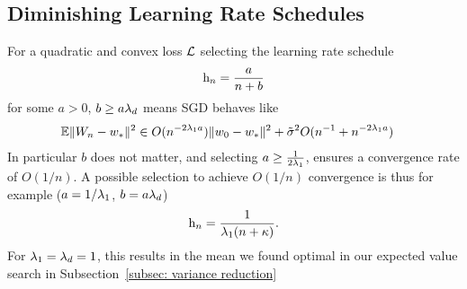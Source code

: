\subsection{Diminishing Learning Rate Schedules}

\begin{theorem}\label{thm: convergence rates for diminishing lr schedules}
	For a quadratic and convex loss \(\mathcal{L}\) selecting the learning rate
	schedule
	\begin{align*}
		\text{h}_n = \frac{a}{n+b}	
	\end{align*}
	for some \(a>0\), \(b\ge a\lambda_d\) means SGD behaves like
	\begin{align*}
		\mathbb{E}\|W_n - w_*\|^2 
		&\in O(n^{-2\lambda_1a})\|w_0-w_*\|^2
		+ \tilde{\sigma}^2 O(n^{-1} + n^{-2\lambda_1 a})
	\end{align*}
	In particular \(b\) does not matter, and selecting \(a\ge\tfrac{1}{2\lambda_1}\),
	ensures a convergence rate of \(O(1/n)\). A possible selection to
	achieve \(O(1/n)\) convergence is thus for example (\(a=1/\lambda_1\), \(b=a\lambda_d\))
	\begin{align*}
		\text{h}_n = \frac{1}{\lambda_1(n+\kappa)}.
	\end{align*}
	For \(\lambda_1=\lambda_d=1\), this results in the mean we found
	optimal in our expected value search in Subsection~\ref{subsec: variance
	reduction}
\end{theorem}
